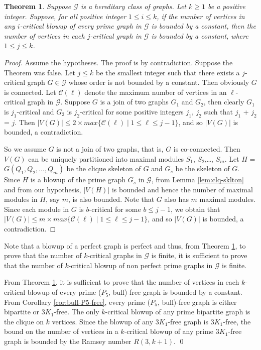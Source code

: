 \documentclass[a4paper,11pt]{article}
\newtheorem{theorem}{Theorem}[section]
\theoremstyle{case}
\begin{document}
\begin{theorem}\label{thm:clq-sklton}
    Suppose $\mathcal{G}$ is a hereditary class of graphs. Let $k\ge 1$ be a positive integer. Suppose, for all positive integer $1\le i \le k$, if the number of vertices in any $i$-critical blowup of every prime graph in $\mathcal{G}$ is bounded by a constant, then the number of vertices in each $j$-critical graph in $\mathcal{G}$ is bounded by a constant, where $1\le j\le k$.
\end{theorem}
\begin{proof}
    Assume the hypotheses. The proof is by contradiction. Suppose the Theorem was false. Let  $j\le k$ be the smallest integer such that there exists a $j$-critical graph $G \in \mathcal{G}$ whose order is not bounded by a constant. Then obviously $G$ is connected. Let $\mathcal{C}(\ell)$ denote the maximum number of vertices in an $\ell$-critical graph in $\mathcal{G}$. Suppose $G$ is a join of two graphs $G_1$ and $G_2$, then clearly $G_1$ is $j_1$-critical and $G_2$ is $j_2$-critical for some positive integers $j_1$, $j_2$ such that $j_1$ + $j_2$ = $j$. Then $|V(G)|\le 2\times max\{\mathcal{C}(\ell)\mid 1\le \ell \le j-1\}$, and so $|V(G)|$ is bounded, a contradiction.

    So we assume $G$ is not a join of two graphs, that is, $G$ is co-connected. Then $V(G)$ can be uniquely partitioned into maximal modules $S_1$, $S_2$,\dots, $S_m$. Let $H$ = $G(Q_1, Q_2,\dots,Q_m)$ be the clique skeleton of $G$ and $G_s$ be the skeleton of $G$. Since $H$ is a blowup of the prime graph $G_s$ in $\mathcal{G}$, from Lemma \ref{lem:clq-sklton} and from our hypothesis, $|V(H)|$ is bounded and hence the number of maximal modules in $H$, say $m$, is also bounded. Note that $G$ also has $m$ maximal modules. Since each module in $G$ is $b$-critical for some $b\le j-1$, we obtain that $|V(G)| \le m\times max\{\mathcal{C}(\ell)\mid 1\le \ell \le j-1\}$, and so $|V(G)|$ is bounded, a contradiction.
\end{proof}

Note that a blowup of a perfect graph is perfect and thus, from Theorem \ref{thm:clq-sklton}, to prove that the number of $k$-critical graphs in $\mathcal{G}$ is finite, it is sufficient to prove that the number of $k$-critical blowup of non perfect prime graphs in $\mathcal{G}$ is finite.

    From Theorem \ref{thm:clq-sklton}, it is sufficient to prove that the number of vertices in each $k$-critical blowup of every prime ($P_5$, bull)-free graph is bounded by a constant. From Corollary \ref{cor:bull-P5-free}, every prime ($P_5$, bull)-free graph is either bipartite or 3$K_1$-free. The only $k$-critical blowup of any prime bipartite graph is the clique on $k$ vertices. Since the blowup of any 3$K_1$-free graph is 3$K_1$-free, the bound on the number of vertices in a $k$-critical blowup of any prime 3$K_1$-free graph is bounded by the Ramsey number $R(3,k+1)$. \qed
\end{document}
